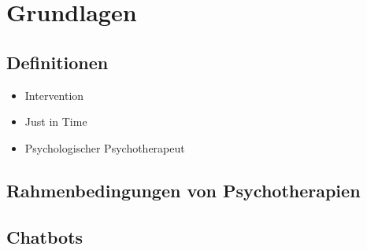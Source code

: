 
\chapter{Grundlagen}
\label{ch:Background}

\section{Definitionen}

\begin{itemize}
\item Intervention
\item Just in Time
\item Psychologischer Psychotherapeut
\end{itemize}

\section{Rahmenbedingungen von Psychotherapien}

\section{Chatbots}

